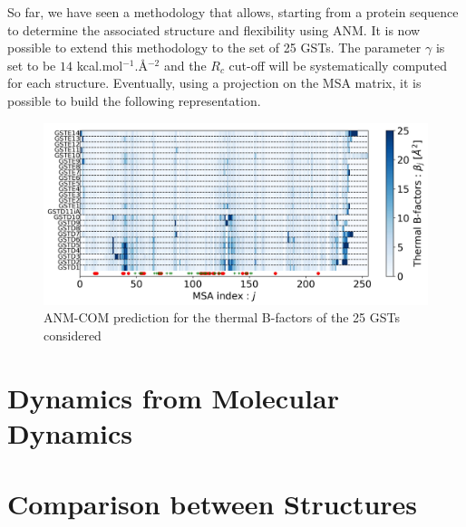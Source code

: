 \noindent So far, we have seen a methodology that allows, starting from a protein sequence to determine the associated structure and flexibility using ANM. It is now possible to extend this methodology to the set of 25 GSTs. The parameter $\gamma$ is set to be $14$ kcal.mol$^{-1}$.\AA$^{-2}$ and the $R_c$ cut-off will be systematically computed for each structure. Eventually, using a projection on the MSA matrix, it is possible to build the following representation.
\begin{figure}[h!]
	\label{ANM-COM + MSA}
	\includegraphics[width = .99\linewidth]{figures/ANM-COM_MSA_rep.jpg}
	\caption{ANM-COM prediction for the thermal B-factors of the 25 GSTs considered}
\end{figure}
\section{Dynamics from Molecular Dynamics}

\section{Comparison between Structures}